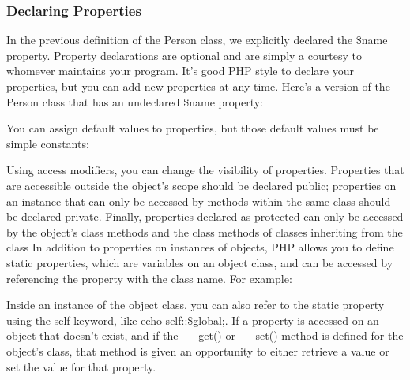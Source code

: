 \documentclass{report}
\begin{document}
\bigbreak \noindent 
\subsubsection{Declaring Properties}
\bigbreak \noindent 
In the previous definition of the Person class, we explicitly declared the \$name property.
Property declarations are optional and are simply a courtesy to whomever maintains
your program. It’s good PHP style to declare your properties, but you can add new
properties at any time.
\bigbreak \noindent 
Here’s a version of the Person class that has an undeclared \$name property:
\bigbreak \noindent 
{}
\bigbreak \noindent 
You can assign default values to properties, but those default values must be simple constants:
\bigbreak \noindent 
{}
\bigbreak \noindent 
Using access modifiers, you can change the visibility of properties. Properties that are accessible outside the object’s scope should be declared public; properties on an instance that can only be accessed by methods within the same class should be declared private. Finally, properties declared as protected can only be accessed by the object’s class methods and the class methods of classes inheriting from the class
\bigbreak \noindent 
In addition to properties on instances of objects, PHP allows you to define static properties, which are variables on an object class, and can be accessed by referencing the
property with the class name. For example:
\bigbreak \noindent 
{}
\bigbreak \noindent 
Inside an instance of the object class, you can also refer to the static property using the
self keyword, like echo self::\$global;.
\bigbreak \noindent 
If a property is accessed on an object that doesn’t exist, and if the \_\_get() or \_\_set()
method is defined for the object’s class, that method is given an opportunity to either
retrieve a value or set the value for that property.
\bigbreak \noindent 
\end{document}
